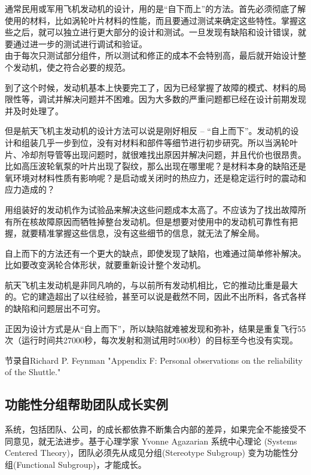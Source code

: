 通常民用或军用飞机发动机的设计，用的是“自下而上”的方法。首先必须彻底了解使用的材料，比如涡轮叶片材料的性能，而且要通过测试来确定这些特性。掌握这些之后，就可以独立进行更大部分的设计和测试。一旦发现有缺陷和设计错误，就要通过进一步的测试进行调试和验证。\\

由于每次只测试部分组件，所以测试和修正的成本不会特别高，最后就开始设计整个发动机，使之符合必要的规范。

到了这个时候，发动机基本上快要完工了，因为已经掌握了故障的模式、材料的局限性等，调试并解决问题并不困难。因为大多数的严重问题都已经在设计前期发现并及时处理了。

但是航天飞机主发动机的设计方法可以说是刚好相反 --  “自上而下”。发动机的设计和组装几乎一步到位，没有对材料和部件等细节进行初步研究。所以当涡轮叶片、冷却剂导管等出现问题时，就很难找出原因并解决问题，并且代价也很昂贵。比如高压波轮氧泵的叶片出现了裂纹，那么出现在哪里呢？是材料本身的缺陷还是氧环境对材料性质有影响呢？是启动或关闭时的热应力，还是稳定运行时的震动和应力造成的？

用组装好的发动机作为试验品来解决这些问题成本太高了。不应该为了找出故障所有所在核故障原因而牺牲掉整台发动机。但是想要对使用中的发动机可靠性有把握，就要精准掌握这些信息，没有这些细节的信息，就无法了解全局。

自上而下的方法还有一个更大的缺点，即使发现了缺陷，也难通过简单修补解决。比如要改变涡轮合体形状，就要重新设计整个发动机。

航天飞机主发动机是非同凡响的，与以前所有发动机相比，它的推动比重是最大的。它的建造超出了以往经验，甚至可以说是截然不同，因此不出所料，各式各样的缺陷和问题层出不可穷。

正因为设计方式是从“自上而下”，所以缺陷就难被发现和弥补，结果是重复飞行55次（运行时间共27000秒，每次发射和测试用时500秒）的目标至今也没有实现。

节录自Richard P. Feynman "Appendix F: Personal observations on the reliability of the Shuttle."


\hypertarget{ux529fux80fdux6027ux5206ux7ec4ux5e2eux52a9ux56e2ux961fux6210ux957fux5b9eux4f8b}{%
\subsection{功能性分组帮助团队成长实例}\label{ux529fux80fdux6027ux5206ux7ec4ux5e2eux52a9ux56e2ux961fux6210ux957fux5b9eux4f8b}}

系统，包括团队、公司，的成长都依靠不断集合内部的差异，如果完全不能接受不同意见，就无法进步。基于心理学家
Yvonne Agazarian 系统中心理论 (Systems Centered
Theory)，团队必须先从成见分组(Stereotype Subgroup)
变为功能性分组(Functional Subgroup)，才能成长。

